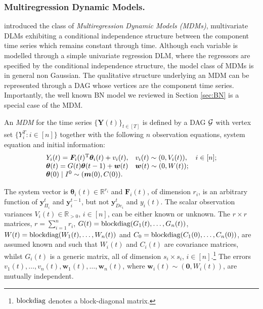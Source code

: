 \subsubsection{Multiregression Dynamic Models.}
\citet{Queen1993} introduced the class of \textit{Multiregression Dynamic Models (MDMs)}, multivariate DLMs exhibiting a conditional independence structure between the component time series which remains constant through time.  Although each variable is modelled through a simple univariate regression DLM, where the regressors are specified by the conditional independence structure, the model class of MDMs is in general non Gaussian. The qualitative structure underlying an MDM can be represented through a DAG whose vertices are the component time series. Importantly, the well known BN model we reviewed in Section \ref{sec:BN} is a special case of the MDM.

\begin{definition}
\label{def:MDM}
An \emph{MDM} for the time series $\{\bm{Y}(t)\}_{t\in[T]}$ is defined by a DAG $\mathcal{G}$ with vertex set $\{Y^T_i:i\in[n]\}$ together with the following $n$ observation equations, system equation and initial information:
\begin{equation*}
\begin{array}{llc}
Y_i(t)=\bm{F}_i(t)^{\textnormal{T}}\bm{\theta}_i(t)+v_i(t),&v_i(t)\sim (0,V_i(t)),&i\in[n];\\
\bm{\theta}(t)=G(t)\bm{\theta}(t-1)+\bm{w}(t)&\bm{w}(t)\sim(0,W(t));&\\
\bm{\theta}(0)\;|\; I^0\sim (\bm{m}(0),C(0)).
\end{array}
\end{equation*}

The system vector is $\bm{\theta}_i(t)\in\mathbb{R}^{r_i}$  and $\bm{F}_i(t)$, of dimension $r_i$, is an arbitrary function of $\bm{y}^t_{\Pi_i}$ and $\bm{y}^{t-1}_i$, but  not $\bm{y}^t_{De_i}$ and $y_i(t)$.  The scalar observation variances  $V_i(t)\in\mathbb{R}_{>0}$, $i\in[n]$, can be either known or unknown. The $r\times r$ matrices, $r=\sum_{i=1}^n r_i$, $G(t)=\textnormal{blockdiag}(G_1(t),\dots,G_n(t))$,  $W(t)=\textnormal{blockdiag}(W_1(t),\dots,W_n(t))$ and   $C_0=\textnormal{blockdiag}(C_1(0),\dots,C_n(0))$, are assumed known and such that $W_i(t)$ and $C_i(t)$ are covariance matrices, whilst $G_i(t)$ is a generic matrix, all of dimension $s_i\times s_i$, $i\in [n]$.\footnote{$\textnormal{blockdiag}$ denotes a block-diagonal matrix.} The errors $v_1(t),\dots,v_n(t),\bm{w}_1(t),\dots,\bm{w}_n(t)$, where $\bm{w}_i(t)\sim(\bm{0},W_i(t))$, are mutually independent.
\end{definition} 

